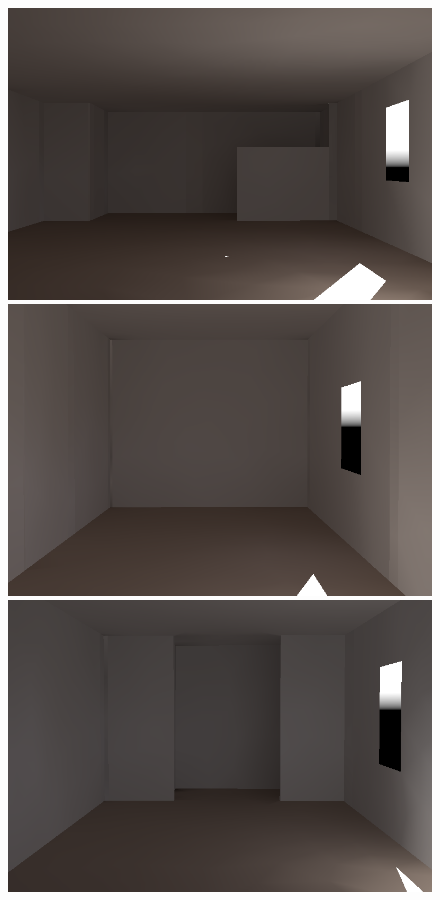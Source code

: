 \begin{figure}[t]
\includegraphics[width=\figwidth]{p2r_mrc331_camera_dark_march_crop.png} \hfill %
\includegraphics[width=\figwidth]{p2r_065_camera_dark_march_crop.png} \hfill %
\includegraphics[width=\figwidth]{p2r_038_camera_dark_march_crop.png} \hfill %

\end{figure}
